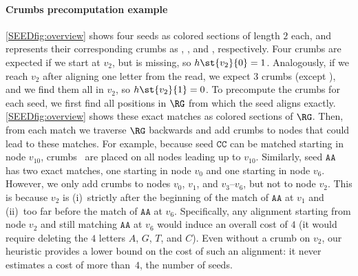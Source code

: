 \paragraph{Crumbs precomputation example}
%
\cref{SEEDfig:overview} shows four seeds as colored sections of length $2$ each, and
represents their corresponding crumbs as \bluecrumb{}, \yellowcrumb{},
\violetcrumb{} and \greencrumb{}, respectively. Four crumbs are expected if we
start at $v_2$, but \bluecrumb{} is missing, so $h\st{v_2}{0}=1$. Analogously,
if we reach $v_2$ after aligning one letter from the read, we expect 3 crumbs
(except \bluecrumb{}), and we find them all in $v_2$, so $h\st{v_2}{1}=0$.
%
To precompute the crumbs for each seed, we first find all positions in $\RG$
from which the seed aligns exactly. \cref{SEEDfig:overview} shows these exact
matches as colored sections of $\RG$. Then, from each match we traverse $\RG$
backwards and add crumbs to nodes that could lead to these matches.
%
For example, because seed \colorbox{light-yellow}{$\mathtt{CC}$} can be matched
starting in node $v_{10}$, crumbs~\yellowcrumb{} are placed on all nodes leading
up to $v_{10}$.
%
Similarly, seed \colorbox{light-blue}{$\mathtt{AA}$} has two exact matches, one
starting in node $v_{0}$ and one starting in node $v_{6}$.
%
However, we only add crumbs \bluecrumb{} to nodes $v_{0}$, $v_{1}$, and
$v_{3}$--$v_{6}$, but not to node $v_{2}$. This is because $v_{2}$ is
(i)~strictly after the beginning of the match of
\colorbox{light-blue}{$\mathtt{AA}$} at $v_1$ and (ii)~too far before the match
of \colorbox{light-blue}{$\mathtt{AA}$} at $v_{6}$.
%
Specifically, any alignment starting from node $v_{2}$ and still matching
\colorbox{light-blue}{$\mathtt{AA}$} at $v_{6}$ would induce an overall cost of
$4$ (it would require deleting the $4$ letters $A$, $G$, $T$, and $C$). Even
without a crumb \bluecrumb{} on $v_{2}$, our heuristic provides a lower bound on
the cost of such an alignment: it never estimates a cost of more than~$4$, the
number of seeds.


